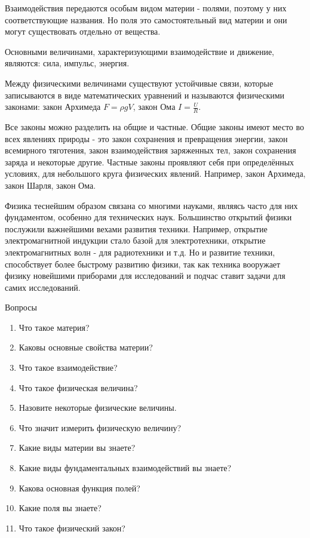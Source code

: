 \documentclass[a6paper, 11pt]{diss_4}
\renewcommand{\'}{\,'}
\begin{document}
 Взаимодействия передаются особым видом материи - полями, поэтому у них
соответствующие названия. Но поля это самостоятельный вид материи и они могут
существовать отдельно от вещества.

 Основными величинами, характеризующими взаимодействие и движение, являются:
сила, импульс, энергия.

 Между физическими величинами существуют устойчивые связи, которые
записываются в виде математических уравнений и называются физическими
законами: закон Архимеда $F=\rho gV$, закон Ома $I=\frac{U}{R}$.


  Все законы можно разделить на общие и частные. Общие законы имеют место во
всех явлениях природы - это закон сохранения и превращения энергии, закон
всемирного тяготения, закон взаимодействия заряженных тел, закон сохранения
заряда и некоторые другие. Частные законы проявляют себя при определённых
условиях, для небольшого круга физических явлений. Например, закон Архимеда,
закон Шарля, закон Ома.

  Физика теснейшим образом связана со многими науками, являясь часто для
них фундаментом, особенно для технических наук. Большинство открытий физики
послужили важнейшими вехами развития техники. Например, открытие
электромагнитной индукции стало базой для электротехники, открытие
электромагнитных волн - для радиотехники и т.д. Но и развитие техники,
способствует более быстрому развитию физики, так как техника вооружает физику
новейшими приборами для исследований и подчас ставит задачи для самих
исследований.

\begin{center}
Вопросы
\end{center}


\begin{enumerate}
  \item Что такое материя?
  \item Каковы основные свойства материи?
  \item Что такое взаимодействие?
  \item Что такое физическая величина?
  \item Назовите некоторые физические величины.
  \item Что значит измерить физическую величину?
  \item Какие виды материи вы знаете?
  \item Какие виды фундаментальных взаимодействий вы знаете?
  \item Какова основная функция полей?
  \item Какие поля вы знаете?
  \item Что такое физический закон?
\end{enumerate}
\end{document}
